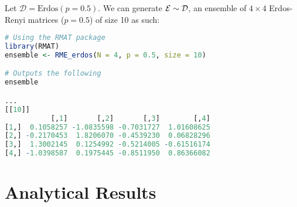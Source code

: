 \begin{code}[Erdos-Renyi p = 0.5 Ensemble]
Let $\mathcal{D} = \text{Erdos}(p = 0.5)$. We can generate $\mathcal{E} \sim \mathcal{D}$, an ensemble of $4 \times 4$ Erdos-Renyi matrices ($p = 0.5$) of size 10 as such:
\end{code}

\begin{lstlisting}[language=R]
# Using the RMAT package
library(RMAT)
ensemble <- RME_erdos(N = 4, p = 0.5, size = 10)

# Outputs the following
ensemble

...
[[10]]
           [,1]       [,2]       [,3]        [,4]
[1,]  0.1058257 -1.0835598 -0.7031727  1.01608625
[2,] -0.2170453  1.8206070 -0.4539230  0.06828296
[3,]  1.3002145  0.1254992 -0.5214005 -0.61516174
[4,] -1.0398587  0.1975445 -0.8511950  0.86366082
\end{lstlisting}

\section{Analytical Results}




